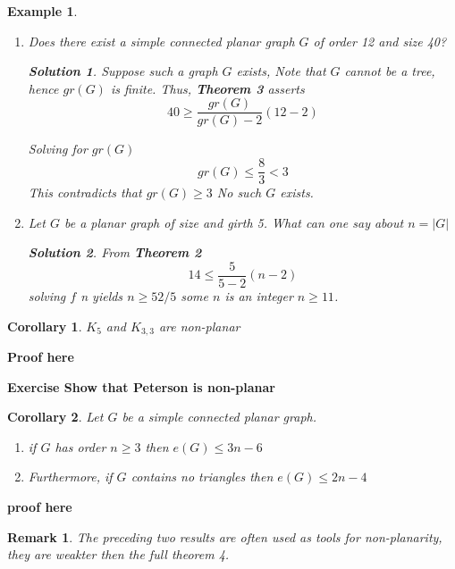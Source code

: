 \documentclass[12pt]{article}
\newtheorem*{corollary}{Corollary}
\newtheorem{example}{Example}
\newtheorem*{remark}{Remark}
\newtheorem{solution}{Solution}
\begin{document}
\begin{example}

	\begin{enumerate}


		\item  Does there exist a simple connected planar graph $G$ of order 12 and size 40?
		      \begin{solution}

			      Suppose such a graph $G$ exists, Note that $G$ cannot be a tree, hence  $gr(G)$ is finite. Thus, \textbf{Theorem 3} asserts
			      \[40 \ge \frac{gr(G)}{gr(G) - 2} (12 - 2)\]

			      Solving for $gr(G)$
			      \[gr(G) \le \frac{8}{3} < 3\]
			      This contradicts that $gr(G) \ge 3$ No such $G$ exists.
		      \end{solution}

		\item Let $G$ be a planar graph of size  and girth 5. What can one  say about $n = \vert G\vert$

		      \begin{solution}
			      From \textbf{Theorem 2}
			      \[14 \le \frac{5}{5-2} (n-2)\]
			      solving $f$ n yields $n\ge 52/5$ some $n$ is an integer $n\ge 11$.
		      \end{solution}
	\end{enumerate}
\end{example}


\begin{corollary}
	$K_{5}$ and $K_{3,3}$ are non-planar
\end{corollary}


\textbf{Proof here}


\textbf{Exercise Show that Peterson is non-planar}


\begin{corollary}
	Let $G$ be a simple connected planar graph.
	\begin{enumerate}
		\item if $G$ has order $n\ge 3$ then $e(G) \le 3n - 6$
		\item Furthermore, if $G$ contains no triangles then $e(G) \le 2n - 4$
	\end{enumerate}

\end{corollary}

\textbf{proof here}


\begin{remark}
	The preceding two results are often used as tools for non-planarity, they are weakter then the full theorem 4.
\end{remark}
\end{document}
